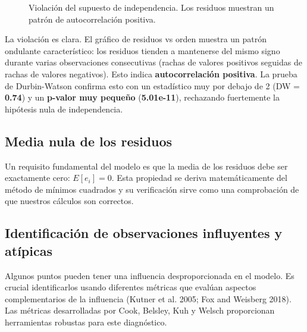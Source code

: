 \documentclass[
  letterpaper,
  DIV=11,
  numbers=noendperiod]{scrreprt}
\begin{document}
\begin{tcolorbox}
\begin{figure}[H]
\caption{\label{fig-independencia-mal}Violación del supuesto de
independencia. Los residuos muestran un patrón de autocorrelación
positiva.}

\end{figure}%

La violación es clara. El gráfico de residuos vs orden muestra un patrón
ondulante característico: los residuos tienden a mantenerse del mismo
signo durante varias observaciones consecutivas (rachas de valores
positivos seguidas de rachas de valores negativos). Esto indica
\textbf{autocorrelación positiva}. La prueba de Durbin-Watson confirma
esto con un estadístico muy por debajo de 2 (DW = \textbf{0.74}) y un
\textbf{p-valor muy pequeño} (\textbf{5.01e-11}), rechazando fuertemente
la hipótesis nula de independencia.

\end{tcolorbox}

\subsection{Media nula de los
residuos}\label{media-nula-de-los-residuos}

Un requisito fundamental del modelo es que la media de los residuos debe
ser exactamente cero: \(E[e_i] = 0\). Esta propiedad se deriva
matemáticamente del método de mínimos cuadrados y su verificación sirve
como una comprobación de que nuestros cálculos son correctos.

\subsection{Identificación de observaciones influyentes y
atípicas}\label{identificaciuxf3n-de-observaciones-influyentes-y-atuxedpicas}

Algunos puntos pueden tener una influencia desproporcionada en el
modelo. Es crucial identificarlos usando diferentes métricas que evalúan
aspectos complementarios de la influencia (Kutner et al. 2005; Fox and
Weisberg 2018). Las métricas desarrolladas por Cook, Belsley, Kuh y
Welsch proporcionan herramientas robustas para este diagnóstico.
\end{document}
